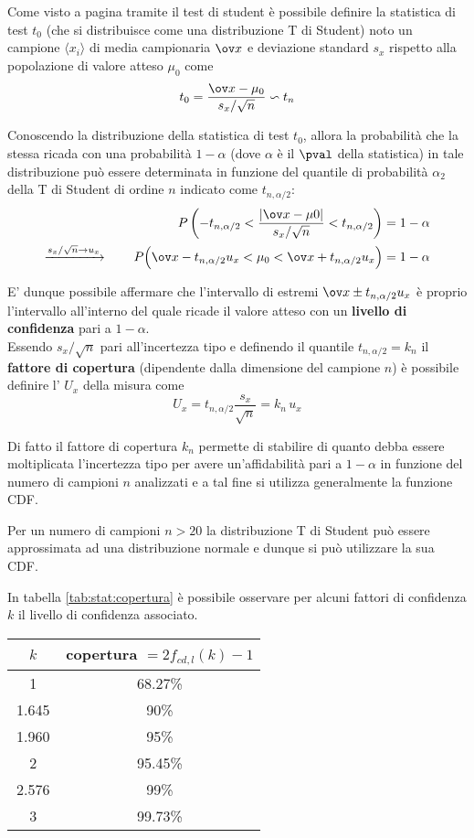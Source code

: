 		\vspace{3mm}
		Come visto a pagina \pageref{sec:stat:teststudent} tramite il test di student è possibile definire la statistica di test $t_0$ (che si distribuisce come una distribuzione T di Student) noto un campione $\langle x_i\rangle$ di media campionaria $\ov x$ e deviazione standard $s_x$ rispetto alla popolazione di valore atteso $\mu_0$ come
		\[ t_0 = \frac{\ov x - \mu_0}{s_x / \sqrt n} \backsim t_n\]
		
		Conoscendo la distribuzione della statistica di test $t_0$, allora la probabilità che la stessa ricada con una probabilità $1-\alpha$ (dove $\alpha$ è il $\pval$ della statistica) in tale distribuzione può essere determinata in funzione del quantile di probabilità $\alpha_2$ della T di Student di ordine $n$ indicato come $t_{n,\alpha/2}$:
		\begin{align*}
			P\left(-t_{n,\alpha/2} < \frac{|\ov x - \mu 0|}{s_x/\sqrt n} < t_{n,\alpha/2} \right) & = 1-\alpha  \\			
			\xrightarrow{s_{x}/\sqrt n \rightarrow u_x} \qquad P \Big(\ov x - t_{n,\alpha/2} u_x < \mu_0  < \ov x + t_{n,\alpha/2} u_x\Big) & = 1- \alpha
		\end{align*}
		
		E' dunque possibile affermare che l'intervallo di estremi $\ov x \pm t_{n,\alpha/2}u_x$ è proprio l'intervallo all'interno del quale ricade il valore atteso con un \textbf{livello di confidenza} pari a $1-\alpha$. \\
		Essendo $s_x /\sqrt n$ pari all'incertezza tipo e definendo il quantile $t_{n,\alpha/2} = k_n$ il \textbf{fattore di copertura} (dipendente dalla dimensione del campione $n$) è possibile definire l' $U_x$ della misura come
		\[ U_x = t_{n,\alpha/2} \frac{ s_x}{\sqrt n} = k_n \, u_x\]
		
		Di fatto il fattore di copertura $k_n$ permette di stabilire di quanto debba essere moltiplicata l'incertezza tipo per avere un'affidabilità pari a $1-\alpha$ in funzione del numero di campioni $n$ analizzati e a tal fine si utilizza generalmente la funzione CDF.
		\begin{nota}
			Per un numero di campioni $n>20$ la distribuzione T di Student può essere approssimata ad una distribuzione normale e dunque si può utilizzare la sua CDF.	
		\end{nota}
		In tabella \ref{tab:stat:copertura} è possibile osservare per alcuni fattori di confidenza $k$ il livello di confidenza associato.
		\begin{SCtable}[1.5][bht]
			\centering
			\begin{tabular} {c | c}
				$\quad k \quad $ & copertura $= 2f_{cd,l}(k)-1$ \\ \hline
				1 & 68.27\% \\
				1.645 & 90\% \\
				1.960 & 95\% \\
				2 & 95.45\% \\
				2.576 & 99\% \\
				3 & 99.73\%
			\end{tabular}
			\caption{livello di confidenza associato al fattore di copertura $k$.} \label{tab:stat:copertura}
		\end{SCtable}
	
